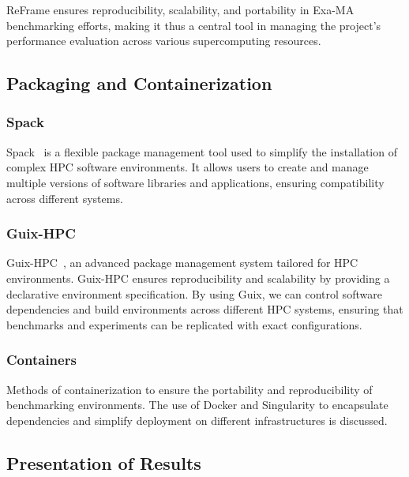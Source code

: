 ReFrame ensures reproducibility, scalability, and portability in Exa-MA benchmarking efforts, making it thus a central tool in managing the project's performance evaluation across various supercomputing resources.


\subsection{Packaging and Containerization}
\label{sec:methodology-packaging}

\subsubsection{Spack}
\label{sec:methodology-packaging-spack}

Spack~\cite{gamblin_spack_2015} is a flexible package management tool used to simplify the installation of complex HPC software environments. It allows users to create and manage multiple versions of software libraries and applications, ensuring compatibility across different systems.

\subsubsection{Guix-HPC}
\label{sec:methodology-packaging-guix-hpc}

Guix-HPC~\cite{vallet_toward_2022}, an advanced package management system tailored for HPC environments. Guix-HPC ensures reproducibility and scalability by providing a declarative environment specification. By using Guix, we can control software dependencies and build environments across different HPC systems, ensuring that benchmarks and experiments can be replicated with exact configurations.


\subsubsection{Containers}
\label{sec:methodology-packaging-container}

Methods of containerization to ensure the portability and reproducibility of benchmarking environments.
The use of Docker and Singularity to encapsulate dependencies and simplify deployment on different infrastructures is discussed.

\subsection{Presentation of Results}
\label{sec:methodology-presentation}


